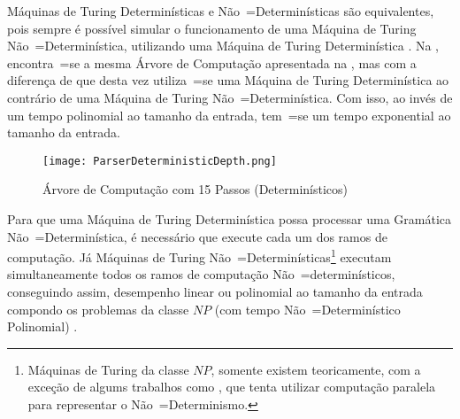 Máquinas de Turing Determinísticas e
Não~=Determinísticas são equivalentes,
pois sempre é possível simular o funcionamento de uma Máquina de Turing Não~=Determinística,
utilizando uma Máquina de Turing Determinística \cite{hopcroftBook}.
Na ,
encontra~=se a mesma Árvore de Computação apresentada na ,
mas com a diferença de que desta vez utiliza~=se uma Máquina de Turing Determinística ao contrário de uma Máquina de Turing Não~=Determinística.
Com isso,
ao invés de um tempo polinomial ao tamanho da entrada,
tem~=se um tempo exponential ao tamanho da entrada.
\begin{figure}[!htb]
\caption{Árvore de Computação com 15 Passos (Determinísticos)}
\label{ParserDeterministic}
\centering
\texttt{[image: ParserDeterministicDepth.png]}
\end{figure}

Para que uma Máquina de Turing Determinística possa processar uma Gramática Não~=Determinística,
é necessário que execute cada um dos ramos de computação.
Já Máquinas de Turing Não~=Determinísticas\footnote{
Máquinas de Turing da classe $NP$,
somente existem teoricamente,
com a exceção de algums trabalhos como ,
que tenta utilizar computação paralela para representar o Não~=Determinismo.
}
executam simultaneamente todos os ramos de computação Não~=determinísticos,
conseguindo assim, desempenho linear ou
polinomial ao tamanho da entrada compondo os problemas da classe $NP$ (com tempo Não~=Determinístico Polinomial) \cite{hopcroftBook}.


